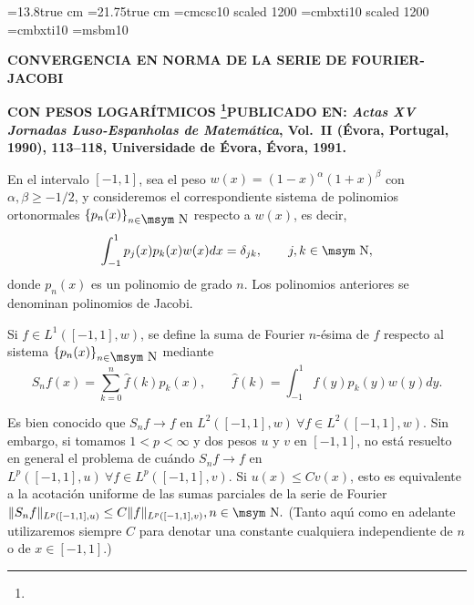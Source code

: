 \hsize=13.8true cm
\vsize=21.75true cm %
\font\docemay=cmcsc10 scaled 1200
\font\doceit=cmbxti10 scaled 1200
\font\diezit=cmbxti10 
\font\msym=msbm10
\def\R{\hbox{\msym R}}
\def\N{\hbox{\msym N}}

\centerline{\bf CONVERGENCIA EN NORMA DE LA SERIE DE FOURIER-JACOBI}
\centerline{\bf CON PESOS LOGAR\'ITMICOS%
\footnote{}{\rm PUBLICADO EN:
{\it Actas XV Jornadas Luso-Espanholas de Matem\'atica}, Vol.~II
(\'Evo\-ra, Portugal, 1990), 113--118,
Universidade de \'Evora, \'Evora, 1991.}}
\vskip 10pt

\vskip 5pt

{\narrower{}\smallskip}


\vskip 7pt
\vskip 10pt

En el intervalo $[-1,1]$, sea el peso $w(x)=(1-x)^\alpha(1+x)^\beta$ con
$\alpha, \beta \ge -1/2$, y consideremos el correspondiente sistema de
polinomios ortonormales $\{p_n(x)\}_{n\in\N}$ respecto a $w(x)$, es decir,
$$\int_{-1}^{1} p_j (x)p_k(x)w(x)dx=\delta_{jk},\qquad j,k\in \N,$$
donde $p_n(x)$ es un polinomio de grado $n$. Los polinomios anteriores se
denominan polinomios de Jacobi.

Si $f\in L^1([-1,1],w)$, se define la suma de Fourier $n$-\'esima de 
$f$ respecto al sistema $\{p_n(x)\}_{n\in\N}$ mediante
$$S_nf(x)=\sum_{k=0}^n\widehat f(k) p_k(x),\qquad 
\widehat f(k)=\int_{-1}^{1} f(y) p_k(y) w(y)dy.$$

Es bien conocido que $S_nf\rightarrow f$ en $L^2([-1,1],w)\ \forall f\in 
L^2([-1,1],w).$ Sin embargo, si tomamos $1<p<\infty$ y dos pesos $u$ y
$v$ en $[-1,1]$, no est\'a resuelto en general el problema de cu\'ando
$S_nf\rightarrow f$ en $L^p([-1,1],u) \ \forall f\in L^p([-1,1],v).$
Si $u(x)\le C v(x)$, esto es equivalente a la acotaci\'on uniforme de las sumas
parciales de la serie de Fourier
$\Vert S_nf\Vert_{L^p([-1,1],u)} \le C\Vert
f\Vert_{L^p([-1,1],v)}, n\in \N.$
(Tanto {aqu\'\i} como en adelante utilizaremos siempre $C$ para denotar una
constante cualquiera independiente de $n$ o de $x\in[-1,1]$.)

